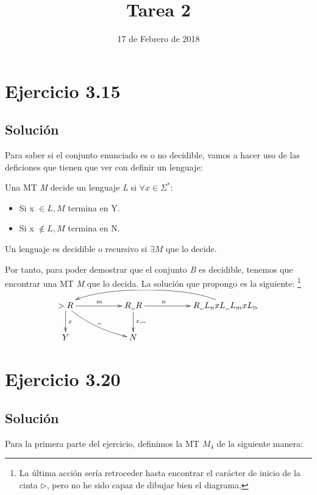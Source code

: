\documentclass[11pt, a4paper, titlepage]{article}
\newcommand\vartextvisiblespace[1][.5em]{%
  \makebox[#1]{%
    \kern.07em
    \vrule height.3ex
    \hrulefill
    \vrule height.3ex
    \kern.07em
  }%
}
\begin{document}
\title{Tarea 2}
\date{17 de Febrero de 2018}
\maketitle
\newpage



\section*{Ejercicio 3.15}
\subsection*{Solución}


Para saber si el conjunto enunciado es o no decidible, vamos a hacer uso de las
deficiones que tienen que ver con definir un lenguaje:

Una MT \textit{M} decide un lenguaje \textit{L} si $\forall x \in \Sigma^*:$
\begin{itemize}
  \item Si x $\in \textit{L}, \textit{M}$ termina en Y.
  \item Si x $\notin \textit{L}, \textit{M}$ termina en N.
\end{itemize}

Un lenguaje es decidible o recursivo si $\exists \textit{M}$ que lo decide.


Por tanto, para poder demostrar que el conjunto \textit{B} es decidible, tenemos
que encontrar una MT \textit{M} que lo decida. La solución que propongo es la
siguiente: \footnote{La última acción sería retroceder hasta encontrar el
carácter de inicio de la cinta $\rhd$, pero no he sido capaz de dibujar bien el
diagrama.}

\[
\xymatrix{
  >R \ar[rr]^{m} \ar[d]^{x} \ar@/_/[rrd]^{\vartextvisiblespace} & & R_{\vartextvisiblespace}R \ar[d]^{x,\vartextvisiblespace} \ar[rr]^(.33){n} && R_{\vartextvisiblespace}L_{n}xL_{\vartextvisiblespace}L_{m}xL_{\rhd} \ar@(ul,ur)[llll] \\
  Y &&N
}
\]

\section*{Ejercicio 3.20}
\subsection*{Solución}

Para la primera parte del ejercicio, definimos la MT $M_4$ de la siguiente
manera:
\end{document}
